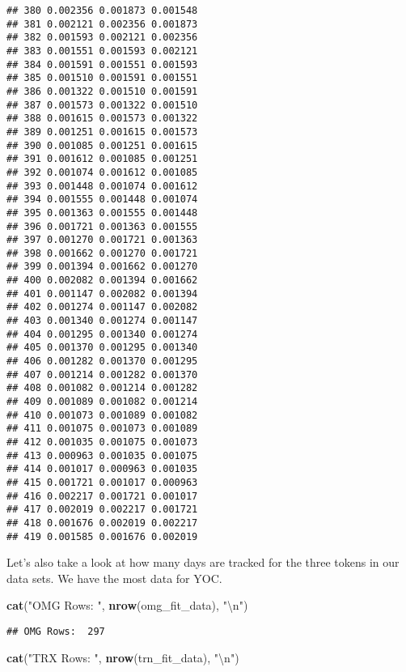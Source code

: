 \documentclass[]{article}
\newenvironment{Shaded}{\begin{snugshade}}{\end{snugshade}}
\newcommand{\KeywordTok}[1]{\textcolor[rgb]{0.13,0.29,0.53}{\textbf{#1}}}
\newcommand{\CharTok}[1]{\textcolor[rgb]{0.31,0.60,0.02}{#1}}
\newcommand{\StringTok}[1]{\textcolor[rgb]{0.31,0.60,0.02}{#1}}
\newcommand{\NormalTok}[1]{#1}
\begin{document}
\begin{verbatim}
## 380 0.002356 0.001873 0.001548
## 381 0.002121 0.002356 0.001873
## 382 0.001593 0.002121 0.002356
## 383 0.001551 0.001593 0.002121
## 384 0.001591 0.001551 0.001593
## 385 0.001510 0.001591 0.001551
## 386 0.001322 0.001510 0.001591
## 387 0.001573 0.001322 0.001510
## 388 0.001615 0.001573 0.001322
## 389 0.001251 0.001615 0.001573
## 390 0.001085 0.001251 0.001615
## 391 0.001612 0.001085 0.001251
## 392 0.001074 0.001612 0.001085
## 393 0.001448 0.001074 0.001612
## 394 0.001555 0.001448 0.001074
## 395 0.001363 0.001555 0.001448
## 396 0.001721 0.001363 0.001555
## 397 0.001270 0.001721 0.001363
## 398 0.001662 0.001270 0.001721
## 399 0.001394 0.001662 0.001270
## 400 0.002082 0.001394 0.001662
## 401 0.001147 0.002082 0.001394
## 402 0.001274 0.001147 0.002082
## 403 0.001340 0.001274 0.001147
## 404 0.001295 0.001340 0.001274
## 405 0.001370 0.001295 0.001340
## 406 0.001282 0.001370 0.001295
## 407 0.001214 0.001282 0.001370
## 408 0.001082 0.001214 0.001282
## 409 0.001089 0.001082 0.001214
## 410 0.001073 0.001089 0.001082
## 411 0.001075 0.001073 0.001089
## 412 0.001035 0.001075 0.001073
## 413 0.000963 0.001035 0.001075
## 414 0.001017 0.000963 0.001035
## 415 0.001721 0.001017 0.000963
## 416 0.002217 0.001721 0.001017
## 417 0.002019 0.002217 0.001721
## 418 0.001676 0.002019 0.002217
## 419 0.001585 0.001676 0.002019
\end{verbatim}

Let's also take a look at how many days are tracked for the three tokens
in our data sets. We have the most data for YOC.

\begin{Shaded}
\begin{Highlighting}[]
\KeywordTok{cat}\NormalTok{(}\StringTok{"OMG Rows: "}\NormalTok{, }\KeywordTok{nrow}\NormalTok{(omg_fit_data), }\StringTok{"}\CharTok{\textbackslash{}n}\StringTok{"}\NormalTok{)}
\end{Highlighting}
\end{Shaded}

\begin{verbatim}
## OMG Rows:  297
\end{verbatim}

\begin{Shaded}
\begin{Highlighting}[]
\KeywordTok{cat}\NormalTok{(}\StringTok{"TRX Rows: "}\NormalTok{, }\KeywordTok{nrow}\NormalTok{(trn_fit_data), }\StringTok{"}\CharTok{\textbackslash{}n}\StringTok{"}\NormalTok{)}
\end{Highlighting}
\end{Shaded}
\end{document}
